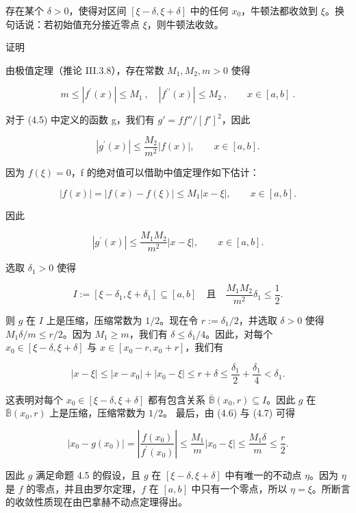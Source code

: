 \begin{theorem}

存在某个 $\delta > 0$，使得对区间 $\left[\xi - \delta, \xi + \delta\right]$ 中的任何 $x_0$，牛顿法都收敛到 $\xi$。换句话说：若初始值充分接近零点 $\xi$，则牛顿法收敛。

证明

\begin{subitems}
\item

由极值定理（推论 III.3.8），存在常数 $ M_{1}, M_{2}, m > 0 $ 使得

\begin{equation}
m\leq|f^{\prime}(x)|\leq M_{1}~,\quad|f^{\prime \prime}(x)|\leq M_{2}~,\qquad x\in[a,b]~.
\end{equation}

对于 (4.5) 中定义的函数 g，我们有 $ g' = ff'' / [f']^2 $，因此

\[
|g^{\prime}(x)|\leq\frac{M_{2}}{m^{2}}|f(x)|,\qquad x\in[a,b].
\]

因为 $ f(\xi) = 0 $，f 的绝对值可以借助中值定理作如下估计：

\begin{equation}
|f(x)|=|f(x)-f(\xi)|\leq M_{1}\left|x-\xi\right|,\qquad x\in[a,b].
\end{equation}

因此

\[
|g^{\prime}(x)|\leq\frac{M_{1}M_{2}}{m^{2}}\left|x-\xi\right|,\qquad x\in[a,b].
\]
\item

选取 $ \delta_{1} > 0 $ 使得

\[
I:=\left[\xi-\delta_{1},\xi+\delta_{1}\right]\subseteq\left[a,b\right]\quad\text{且}\quad\frac{M_{1}M_{2}}{m^{2}}\delta_{1}\leq\frac{1}{2}.
\]

则 $g$ 在 $I$ 上是压缩，压缩常数为 $1/2$。现在令 $r := \delta_1/2$，并选取 $\delta > 0$ 使得 $M_1\delta/m \leq r/2$。因为 $M_1 \geq m$，我们有 $\delta \leq \delta_1/4$。因此，对每个 $x_0 \in [\xi - \delta, \xi + \delta]$ 与 $x \in [x_0 - r, x_0 + r]$，我们有

\[
\left|x-\xi\right|\leq\left|x-x_{0}\right|+\left|x_{0}-\xi\right|\leq r+\delta\leq\frac{\delta_{1}}{2}+\frac{\delta_{1}}{4}<\delta_{1}.
\]

这表明对每个 $ x_0 \in [\xi - \delta, \xi + \delta] $ 都有包含关系 $ \bar{\mathbb{B}}(x_0, r) \subseteq I $。因此 $ g $ 在 $ \bar{\mathbb{B}}(x_0, r) $ 上是压缩，压缩常数为 $ 1/2 $。
最后，由 (4.6) 与 (4.7) 可得

\[
\left|x_{0}-g(x_{0})\right|=\left|\frac{f(x_{0})}{f^{\prime}(x_{0})}\right|\leq\frac{M_{1}}{m}\left|x_{0}-\xi\right|\leq\frac{M_{1}\delta}{m}\leq\frac{r}{2}.
\]

因此 $g$ 满足命题 4.5 的假设，且 $g$ 在 $\left[\xi-\delta,\xi+\delta\right]$ 中有唯一的不动点 $\eta$。因为 $\eta$ 是 $f$ 的零点，并且由罗尔定理，$f$ 在 $[a,b]$ 中只有一个零点，所以 $\eta=\xi$。所断言的收敛性质现在由巴拿赫不动点定理得出。

\end{subitems}

\end{theorem}

